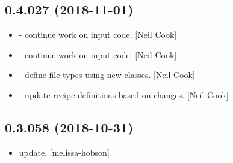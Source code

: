 \documentclass[a4paper,10pt,english]{report}
\begin{document}
\subsection{0.4.027 (2018-11-01)}
\label{\detokenize{misc/changelog:id273}}\begin{itemize}
\item {} 
 - continue work on input code. {[}Neil Cook{]}

\item {} 
 - continue work on input code. {[}Neil Cook{]}

\item {} 
 - define file types using new classes. {[}Neil Cook{]}

\item {} 
 - update recipe definitions based on changes. {[}Neil Cook{]}

\end{itemize}


\subsection{0.3.058 (2018-10-31)}
\label{\detokenize{misc/changelog:id274}}\begin{itemize}
\item {} 
 update. {[}melissa-hobson{]}

\end{itemize}
\end{document}
